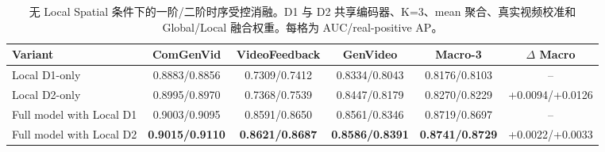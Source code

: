 \begin{table}[t]
  \centering
  \caption{无 Local Spatial 条件下的一阶/二阶时序受控消融。D1 与 D2 共享编码器、K=3、mean 聚合、真实视频校准和 Global/Local 融合权重。每格为 AUC/real-positive AP。}
  \label{tab:temporal_ablation}
  {\scriptsize
  \setlength{\tabcolsep}{3.5pt}
  \renewcommand{\arraystretch}{1.10}
  \begin{tabular}{lccccc}
    \toprule
    Variant & ComGenVid & VideoFeedback & GenVideo & Macro-3 & $\Delta$ Macro \\
    \midrule
    Local D1-only & 0.8883/0.8856 & 0.7309/0.7412 & 0.8334/0.8043 & 0.8176/0.8103 & -- \\
    Local D2-only & 0.8995/0.8970 & 0.7368/0.7539 & 0.8447/0.8179 & 0.8270/0.8229 & +0.0094/+0.0126 \\
    \midrule
    Full model with Local D1 & 0.9003/0.9095 & 0.8591/0.8650 & 0.8561/0.8346 & 0.8719/0.8697 & -- \\
    Full model with Local D2 & \textbf{0.9015/0.9110} & \textbf{0.8621/0.8687} & \textbf{0.8586/0.8391} & \textbf{0.8741/0.8729} & +0.0022/+0.0033 \\
    \bottomrule
  \end{tabular}}
\end{table}
